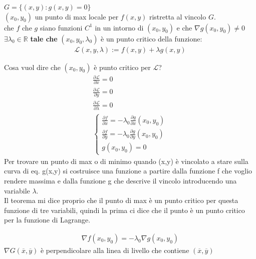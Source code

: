 \documentclass[a4paper, oneside]{article}
\begin{document}
        \begin{theorem}
             $G = \{(x,y): g(x,y) = 0\}$\\
             $(x_0,y_0)$ un punto di max locale per $f(x,y)$ ristretta al vincolo $G$.\\
             che  $f$ che $g$ siano funzioni $C^1$ in un intorno di $(x_0,y_0)$ e che $\nabla g(x_0,y_0) \neq 0$\\
             $\exists \lambda_0 \in \mathbb{R}$ \textbf{tale che} $(x_0,y_0,\lambda_0)$ è un punto critico della funzione:
        \begin{gather*}
                \mathcal{L}(x,y,\lambda) := f(x,y) + \lambda g(x,y)
            \end{gather*}
        \end{theorem}


        Cosa vuol dire che $(x_0,y_0)$ è punto critico per $\mathcal{L}$?
        \begin{gather*}
            \frac{\partial \mathcal{L}}{\partial x}=0\\
            \frac{\partial \mathcal{L}}{\partial y}=0\\
            \frac{\partial \mathcal{L}}{\partial \lambda}=0\\
            \begin{cases}
                \frac{\partial f}{\partial x} = -\lambda_0 \frac{\partial g}{\partial x}(x_0,y_0)\\
                \frac{\partial f}{\partial y} = -\lambda_0 \frac{\partial g}{\partial y}(x_0,y_0)\\
                g(x_0,y_0) = 0
            \end{cases}
        \end{gather*}
        Per trovare un punto di max o di minimo quando (x,y) è vincolato a stare sulla curva di eq. g(x,y) si costruisce una funzione a partire dalla funzione f che voglio rendere massima e dalla funzione g che descrive il vincolo introducendo una variabile $\lambda$.\\
        Il teorema mi dice proprio che il punto di max è un punto critico per questa funzione di tre variabili, quindi la prima ci dice che il punto è un punto critico per la funzione di Lagrange.
        
        
        \begin{proposition}
            \begin{gather*}
                \nabla f(x_0,y_0) = -\lambda_0 \nabla g(x_0,y_0)
            \end{gather*}
            $\nabla G(\overline{x}, \overline{y}) $ è perpendicolare alla linea di livello che contiene $(\overline{x}, \overline{y})$
        \end{proposition}
\end{document}
